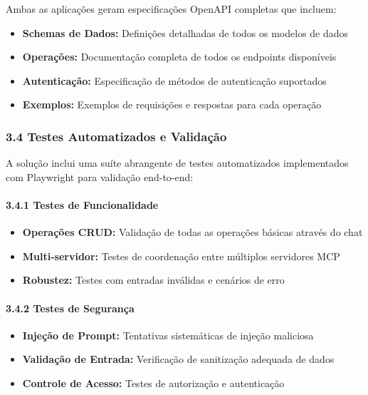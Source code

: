 \documentclass[
]{article}
\providecommand{\tightlist}{%
  \setlength{\itemsep}{0pt}\setlength{\parskip}{0pt}}
\begin{document}
Ambas as aplicações geram especificações OpenAPI completas que incluem:

\begin{itemize}
\tightlist
\item
  \textbf{Schemas de Dados:} Definições detalhadas de todos os modelos
  de dados
\item
  \textbf{Operações:} Documentação completa de todos os endpoints
  disponíveis
\item
  \textbf{Autenticação:} Especificação de métodos de autenticação
  suportados
\item
  \textbf{Exemplos:} Exemplos de requisições e respostas para cada
  operação
\end{itemize}

\subsubsection{3.4 Testes Automatizados e
Validação}\label{testes-automatizados-e-validauxe7uxe3o}

A solução inclui uma suíte abrangente de testes automatizados
implementados com Playwright para validação end-to-end:

\paragraph{3.4.1 Testes de
Funcionalidade}\label{testes-de-funcionalidade}

\begin{itemize}
\tightlist
\item
  \textbf{Operações CRUD:} Validação de todas as operações básicas
  através do chat
\item
  \textbf{Multi-servidor:} Testes de coordenação entre múltiplos
  servidores MCP
\item
  \textbf{Robustez:} Testes com entradas inválidas e cenários de erro
\end{itemize}

\paragraph{3.4.2 Testes de Segurança}\label{testes-de-seguranuxe7a}

\begin{itemize}
\tightlist
\item
  \textbf{Injeção de Prompt:} Tentativas sistemáticas de injeção
  maliciosa
\item
  \textbf{Validação de Entrada:} Verificação de sanitização adequada de
  dados
\item
  \textbf{Controle de Acesso:} Testes de autorização e autenticação
\end{itemize}
\end{document}
